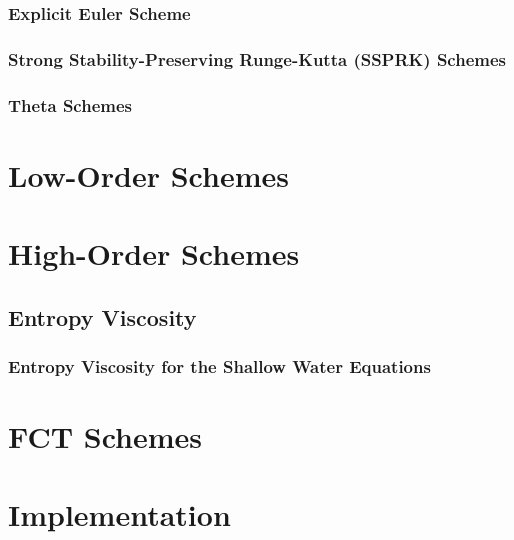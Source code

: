     \subsubsection{Explicit Euler Scheme}
      
    \subsubsection{Strong Stability-Preserving Runge-Kutta (SSPRK)
      Schemes\label{sec:ssprk}}
      
    \subsubsection{Theta Schemes\label{sec:theta}}
      
\section{Low-Order Schemes}  
%     
%     
%     
%     
%     
\section{High-Order Schemes}  
  \subsection{Entropy Viscosity}
    \subsubsection{Entropy Viscosity for the Shallow Water Equations}
      
\section{FCT Schemes}  
\section{Implementation}  
